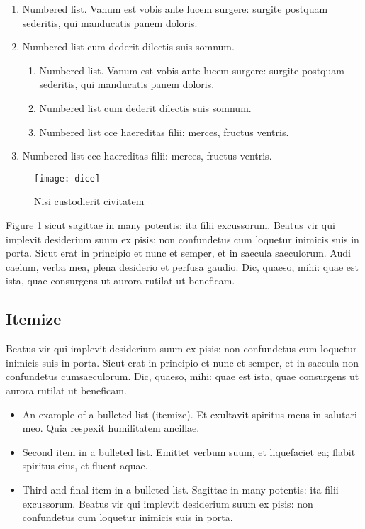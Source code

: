 \documentclass[numbers,compress]{vmsta2}
\theoremstyle{definition}
\begin{document}
\begin{enumerate}
\item Numbered list. Vanum est vobis ante lucem surgere: surgite
postquam sederitis, qui manducatis panem doloris.

\item Numbered list cum dederit dilectis suis somnum.

\begin{enumerate}
\item Numbered list. Vanum est vobis ante lucem surgere: surgite
postquam sederitis, qui manducatis panem doloris.

\item Numbered list cum dederit dilectis suis somnum.

\item Numbered list cce haereditas filii: merces, fructus ventris.
\end{enumerate}

\item Numbered list cce haereditas filii: merces, fructus ventris.
\end{enumerate}


\begin{figure}[t]
\texttt{[image: dice]}%
\caption{Nisi custodierit civitatem}\label{f2} %
\end{figure}

Figure \ref{f2} sicut sagittae in many potentis: ita filii excussorum. Beatus vir qui
implevit desiderium suum ex pisis: non confundetus cum loquetur inimicis
suis in porta.  Sicut erat in principio et nunc et semper, et in saecula
saeculorum. Audi caelum, verba mea, plena desiderio et perfusa gaudio.
Dic, quaeso, mihi: quae est ista, quae consurgens ut aurora rutilat ut
beneficam.


\subsection{Itemize}

Beatus vir qui implevit desiderium
suum ex pisis: non confundetus cum loquetur inimicis suis in porta.
Sicut erat in principio et nunc et semper, et in saecula non
confundetus cumsaeculorum. Dic, quaeso, mihi: quae est ista, quae
consurgens ut aurora rutilat ut beneficam.

\begin{itemize}
\item An example of a bulleted list (itemize). Et exultavit spiritus meus in salutari meo.
Quia respexit humilitatem ancillae.

\item Second item in a bulleted list. Emittet verbum suum, et liquefaciet
ea; flabit spiritus eius, et fluent aquae.

\item Third and final item in a bulleted list. Sagittae in many potentis:
ita filii excussorum.  Beatus vir qui implevit desiderium suum ex
pisis: non confundetus cum loquetur inimicis suis in porta.
\end{itemize}
\end{document}
